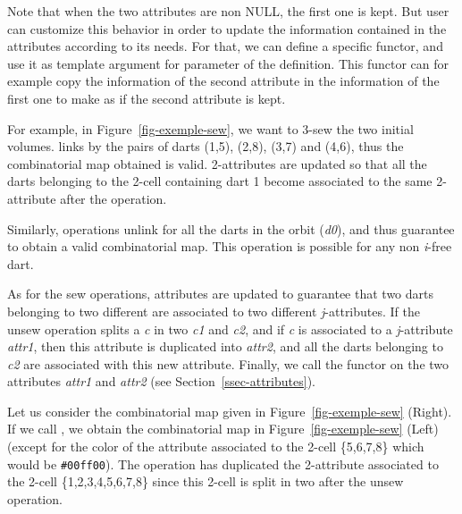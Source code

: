 Note that when the two attributes are non NULL, the first one is
kept. But user can customize this behavior in order to update the
information contained in the attributes according to its needs.  For
that, we can define a specific functor, and use it as template
argument for  parameter of the 
definition. This functor can for example copy the information of the
second attribute in the information of the first one to make as if the
second attribute is kept.

For example, in Figure~\ref{fig-exemple-sew}, we want to 3-sew the two
initial volumes.  links by \betatrois{} the pairs of
darts (1,5), (2,8), (3,7) and (4,6), thus the combinatorial map
obtained is valid. 2-attributes are updated so that all the darts
belonging to the 2-cell containing dart 1 become associated to the
same 2-attribute after the operation.

Similarly,  operations unlink \betai{} for all the darts
in the orbit 
\orbit{\betaun{},\myldots{},\betaimdeux{},\betaipdeux{},\myldots{},\betad{}}(\emph{d0}), 
and thus guarantee to obtain a valid combinatorial map.  This
operation is possible for any non \emph{i}-free dart.

As for the sew operations, attributes are updated to
guarantee that two darts belonging to two different  are
associated to two different \emph{j}-attributes.  If the unsew operation
splits a  \emph{c} in two  \emph{c1} and \emph{c2}, and if \emph{c} is
associated to a \emph{j}-attribute \emph{attr1}, then this attribute is duplicated
into \emph{attr2}, and all the darts belonging to \emph{c2} are associated
with this new attribute.  Finally, we call the functor 
on the two attributes \emph{attr1} and \emph{attr2} (see
Section~\ref{ssec-attributes}).

Let us consider the combinatorial map given in
Figure~\ref{fig-exemple-sew} (Right). If we call , we
obtain the combinatorial map in Figure~\ref{fig-exemple-sew} (Left)
(except for the color of the attribute associated to the
2-cell \{5,6,7,8\} which would be \texttt{\#00ff00}).  The 
operation has duplicated the 2-attribute associated to the 2-cell
\{1,2,3,4,5,6,7,8\} since this 2-cell is split in two after the
unsew operation.

